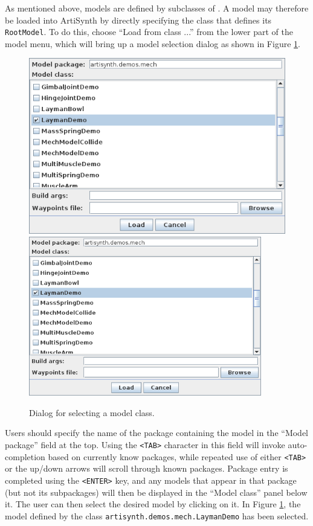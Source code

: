 \documentclass{article}
\begin{document}
As mentioned above, models are defined by subclasses of 
.
A model may therefore be loaded into ArtiSynth by
directly specifying the class that defines its {\tt RootModel}.  To do
this, choose {\sf ``Load from class ...''} from the lower part
of the model menu, 
which will bring up a model selection dialog as shown in Figure
\ref{modelClassSelector:fig}.

\begin{figure}[h]
\begin{center}
\iflatexml
\includegraphics[]{images/modelClassSelector}
\else
\includegraphics[width=4in]{images/modelClassSelector}
\fi
\end{center}
\caption{Dialog for selecting a model class.}%
\label{modelClassSelector:fig}
\end{figure}

Users should specify the name of the package containing the model in
the {\sf ``Model package''} field at the top. Using the {\tt <TAB>}
character in this field will invoke auto-completion based on currently
know packages, while repeated use of either {\tt <TAB>} or the up/down
arrows will scroll through known packages. Package entry is completed
using the {\tt <ENTER>} key, and any models that appear in that
package (but not its subpackages) will then be displayed in the {\sf ``Model
class''} panel below it. The user can then select the desired model by
clicking on it. In Figure \ref{modelClassSelector:fig}, the model
defined by the class {\tt artisynth.demos.mech.LaymanDemo} has been
selected.
\end{document}
